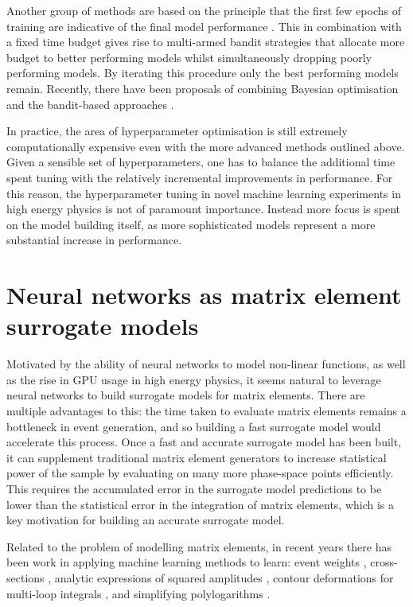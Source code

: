 \documentclass[main.tex]{subfiles}
\begin{document}
    Another group of methods are based on the principle
    that the first few epochs of training are indicative
    of the final model performance \cite{pmlr-v28-bubeck13}. This in combination
    with a fixed time budget gives rise to multi-armed
    bandit strategies \cite{jamieson2016non,li2017hyperband}
    that allocate more budget to better
    performing models whilst simultaneously dropping poorly
    performing models. By iterating this procedure only the 
    best performing models remain. Recently, there have
    been proposals of combining Bayesian optimisation and
    the bandit-based approaches \cite{falkner2018bohb}.
    
    In practice, the area of hyperparameter optimisation
    is still extremely computationally expensive even with
    the more advanced methods outlined above. Given a sensible set of hyperparameters,
    one has to balance the additional time spent tuning with the
    relatively incremental improvements in performance. For this reason,
    the hyperparameter tuning in novel machine learning experiments
    in high energy physics is not of paramount importance.
    Instead more focus is spent on the model building itself, as
    more sophisticated models represent a more substantial increase
    in performance.

\section{Neural networks as matrix element surrogate models}\label{sec:NN_ME}
    Motivated by the ability of neural networks to
    model non-linear functions, as well as the rise
    in GPU usage in high energy physics, it seems
    natural to leverage neural networks to build surrogate
    models for matrix elements. There are multiple advantages
    to this: the time taken to evaluate matrix elements remains
    a bottleneck in event generation, and so building a
    fast surrogate model would accelerate this process.
    Once a fast and accurate surrogate model has been
    built, it can supplement traditional matrix
    element generators to increase statistical power of the sample
    by evaluating on many more phase-space points efficiently. This
    requires the accumulated error in the surrogate model
    predictions to be lower than the statistical error in the
    integration of matrix elements, which is a key motivation
    for building an accurate surrogate model.

    Related to the problem of modelling matrix elements, in recent
    years there has been work in applying machine learning
    methods to learn: event weights \cite{Danziger:2021eeg},
    cross-sections \cite{Otten:2018kum,Buckley:2020bxg},
    analytic expressions of squared amplitudes \cite{Alnuqaydan:2022ncd},
    contour deformations for multi-loop integrals \cite{Winterhalder:2021ngy},
    and simplifying polylogarithms \cite{Dersy:2022bym}.
\end{document}
